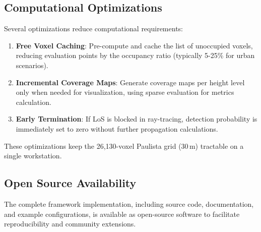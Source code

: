 \subsection{Computational Optimizations}

Several optimizations reduce computational requirements:

\begin{enumerate}
\item \textbf{Free Voxel Caching}: Pre-compute and cache the list of unoccupied voxels, reducing evaluation points by the occupancy ratio (typically 5-25\% for urban scenarios).

\item \textbf{Incremental Coverage Maps}: Generate coverage maps per height level only when needed for visualization, using sparse evaluation for metrics calculation.

\item \textbf{Early Termination}: If LoS is blocked in ray-tracing, detection probability is immediately set to zero without further propagation calculations.
\end{enumerate}

These optimizations keep the 26,130-voxel Paulista grid (30\,m) tractable on a single workstation.

\subsection{Open Source Availability}

The complete framework implementation, including source code, documentation, and example configurations, is available as open-source software to facilitate reproducibility and community extensions.


